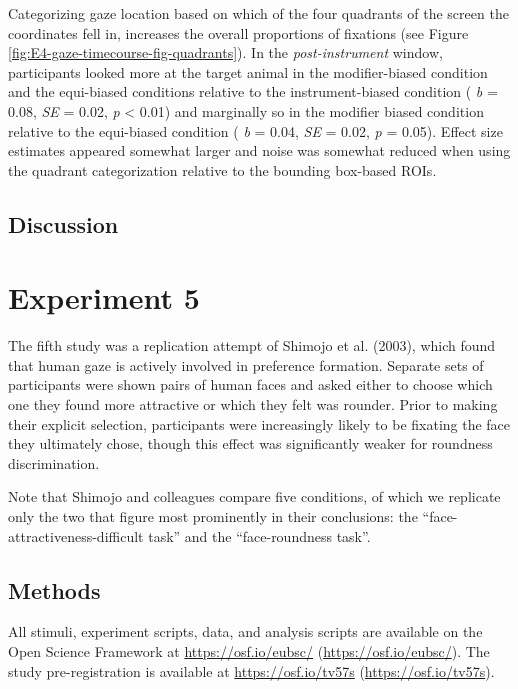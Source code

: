 \documentclass[
  man,floatsintext]{apa6}
\begin{document}
Categorizing gaze location based on which of the four quadrants of the screen the coordinates fell in, increases the overall proportions of fixations (see Figure \ref{fig:E4-gaze-timecourse-fig-quadrants}). In the \emph{post-instrument} window, participants looked more at the target animal in the modifier-biased condition and the equi-biased conditions relative to the instrument-biased condition ( \emph{b} = 0.08, \emph{SE} = 0.02, \emph{p} \textless{} 0.01) and marginally so in the modifier biased condition relative to the equi-biased condition ( \emph{b} = 0.04, \emph{SE} = 0.02, \emph{p} = 0.05). Effect size estimates appeared somewhat larger and noise was somewhat reduced when using the quadrant categorization relative to the bounding box-based ROIs.

\hypertarget{discussion-3}{%
\subsection{Discussion}\label{discussion-3}}

\hypertarget{experiment-5}{%
\section{Experiment 5}\label{experiment-5}}

The fifth study was a replication attempt of Shimojo et al. (2003),
which found that human gaze is actively involved in preference
formation. Separate sets of participants were shown pairs of human faces
and asked either to choose which one they found more attractive or which
they felt was rounder. Prior to making their explicit selection,
participants were increasingly likely to be fixating the face they
ultimately chose, though this effect was significantly weaker for
roundness discrimination.

Note that Shimojo and colleagues compare five conditions, of which we
replicate only the two that figure most prominently in their
conclusions: the ``face-attractiveness-difficult task'' and the
``face-roundness task''.

\hypertarget{methods-4}{%
\subsection{Methods}\label{methods-4}}

All stimuli, experiment scripts, data, and analysis scripts are
available on the Open Science Framework at \url{https://osf.io/eubsc/}
(\url{https://osf.io/eubsc/}). The study pre-registration is available at
\url{https://osf.io/tv57s} (\url{https://osf.io/tv57s}).
\end{document}
